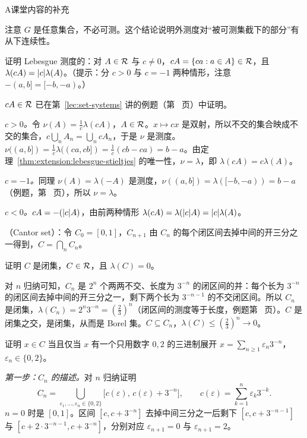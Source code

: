 \begin{exercises}{A}{课堂内容的补充}
\begin{questions}
\begin{solution}
注意 $G$ 是任意集合，不必可测。这个结论说明外测度对“被可测集截下的部分”有从下连续性。
\end{solution}
\end{questions}

\item\label{ex:extension:A3} 证明 Lebesgue 测度的：对 $A\in\mathcal{R}$ 与 $c\neq0$，$cA=\{ca:a\in A\}\in\mathcal{R}$，且 $\lambda(cA)=\lvert c\rvert\lambda(A)$。（提示：分 $c>0$ 与 $c=-1$ 两种情形，注意 $-(a,b]=[-b,-a)$。）
\begin{solution}
$cA\in\mathcal{R}$ 已在第~\ref{lec:set-systems} 讲的例题（第~\pageref{we:set-systems:translation} 页）中证明。

\emph{$c>0$。}令 $\nu(A)=\frac1c\lambda(cA)$，$A\in\mathcal{R}$。$x\mapsto cx$ 是双射，所以不交的集合映成不交的集合，$c\bigcup_nA_n=\bigcup_n cA_n$，于是 $\nu$ 是测度。$\nu((a,b])=\frac1c\lambda((ca,cb])=\frac1c(cb-ca)=b-a$。由定理~\ref{thm:extension:lebesgue-stieltjes} 的唯一性，$\nu=\lambda$，即 $\lambda(cA)=c\lambda(A)$。

\emph{$c=-1$。}同理 $\nu(A)=\lambda(-A)$ 是测度，$\nu((a,b])=\lambda([-b,-a))=b-a$（例题，第~\pageref{we:extension:atoms} 页），所以 $\nu=\lambda$。

\emph{$c<0$。}$cA=-(\lvert c\rvert A)$，由前两种情形 $\lambda(cA)=\lambda(\lvert c\rvert A)=\lvert c\rvert\lambda(A)$。
\end{solution}

\item\label{ex:extension:A4} （Cantor set）：令 $C_0=[0,1]$，$C_{n+1}$ 由 $C_n$ 的每个闭区间去掉中间的开三分之一得到，$C=\bigcap_nC_n$。
\begin{questions}
\item 证明 $C$ 是闭集，$C\in\mathcal{R}$，且 $\lambda(C)=0$。
\begin{solution}
对 $n$ 归纳可知，$C_n$ 是 $2^n$ 个两两不交、长度为 $3^{-n}$ 的闭区间的并：每个长为 $3^{-n}$ 的闭区间去掉中间的开三分之一，剩下两个长为 $3^{-n-1}$ 的不交闭区间。所以 $C_n$ 是闭集，$\lambda(C_n)=2^n3^{-n}=(\frac23)^n$（闭区间的测度等于长度，例题第~\pageref{we:extension:atoms} 页）。$C$ 是闭集之交，是闭集，从而是 Borel 集。$C\subseteq C_n$，$\lambda(C)\leqslant(\frac23)^n\to0$。
\end{solution}
\item 证明 $x\in C$ 当且仅当 $x$ 有一个只用数字 $0,2$ 的三进制展开 $x=\sum_{n\geqslant1}\varepsilon_n3^{-n}$，$\varepsilon_n\in\{0,2\}$。
\begin{solution}
\emph{第一步：$C_n$ 的描述。}对 $n$ 归纳证明
\[
C_n=\bigcup_{\varepsilon_1,\dots,\varepsilon_n\in\{0,2\}}\bigl[c(\varepsilon),\,c(\varepsilon)+3^{-n}\bigr],\qquad c(\varepsilon)=\sum_{k=1}^n\varepsilon_k3^{-k}.
\]
$n=0$ 时是 $[0,1]$。区间 $[c,c+3^{-n}]$ 去掉中间三分之一后剩下 $[c,c+3^{-n-1}]$ 与 $[c+2\cdot3^{-n-1},c+3^{-n}]$，分别对应 $\varepsilon_{n+1}=0$ 与 $\varepsilon_{n+1}=2$。


\end{solution}
\end{questions}
\end{exercises}
